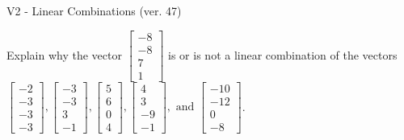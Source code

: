 \begin{exercise}
  \begin{exerciseTitle}V2 - Linear Combinations (ver. 47)\end{exerciseTitle}
  \begin{exerciseStatement}
    Explain why the vector \(\left[\begin{array}{c}
-8 \\
-8 \\
7 \\
1
\end{array}\right]\)  is or is not a linear 
	combination of the vectors \(\left[\begin{array}{c}
-2 \\
-3 \\
-3 \\
-3
\end{array}\right] , \left[\begin{array}{c}
-3 \\
-3 \\
3 \\
-1
\end{array}\right] , \left[\begin{array}{c}
5 \\
6 \\
0 \\
4
\end{array}\right] , \left[\begin{array}{c}
4 \\
3 \\
-9 \\
-1
\end{array}\right] , \text{ and } \left[\begin{array}{c}
-10 \\
-12 \\
0 \\
-8
\end{array}\right]\).
	



\end{exerciseStatement}
\end{exercise}
